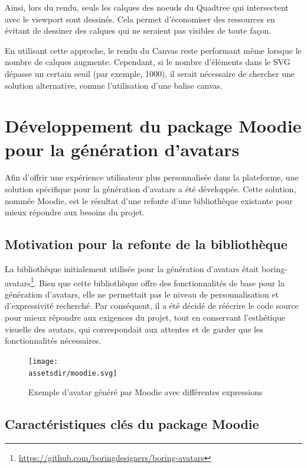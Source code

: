 Ainsi, lors du rendu, seuls les calques des noeuds du Quadtree qui intersectent avec le viewport sont dessinés. Cela permet d'économiser des ressources en évitant de dessiner des calques qui ne seraient pas visibles de toute façon.

En utilisant cette approche, le rendu du Canvas reste performant même lorsque le nombre de calques augmente. Cependant, si le nombre d'éléments dans le SVG dépasse un certain seuil (par exemple, 1000), il serait nécessaire de chercher une solution alternative, comme l'utilisation d'une balise canvas.

\section{Développement du package Moodie pour la génération d'avatars\label{moodie}}

Afin d'offrir une expérience utilisateur plus personnalisée dans la plateforme, une solution spécifique pour la génération d'avatars a été développée. Cette solution, nommée Moodie, est le résultat d'une refonte d'une bibliothèque existante pour mieux répondre aux besoins du projet.

\subsection{Motivation pour la refonte de la bibliothèque}

La bibliothèque initialement utilisée pour la génération d'avatars était boring-avatars\footnote{\url{https://github.com/boringdesigners/boring-avatars}}. Bien que cette bibliothèque offre des fonctionnalités de base pour la génération d'avatars, elle ne permettait pas le niveau de personnalisation et d'expressivité recherché. Par conséquent, il a été décidé de réécrire le code source pour mieux répondre aux exigences du projet, tout en conservant l'esthétique visuelle des avatars, qui correspondait aux attentes et de garder que les fonctionnalités nécessaires.

\begin{figure}[H]
    \centering
    \texttt{[image: \\assetsdir/moodie.svg]}
    \caption{Exemple d'avatar généré par Moodie avec différentes expressions}
\end{figure}

\subsection{Caractéristiques clés du package Moodie}

